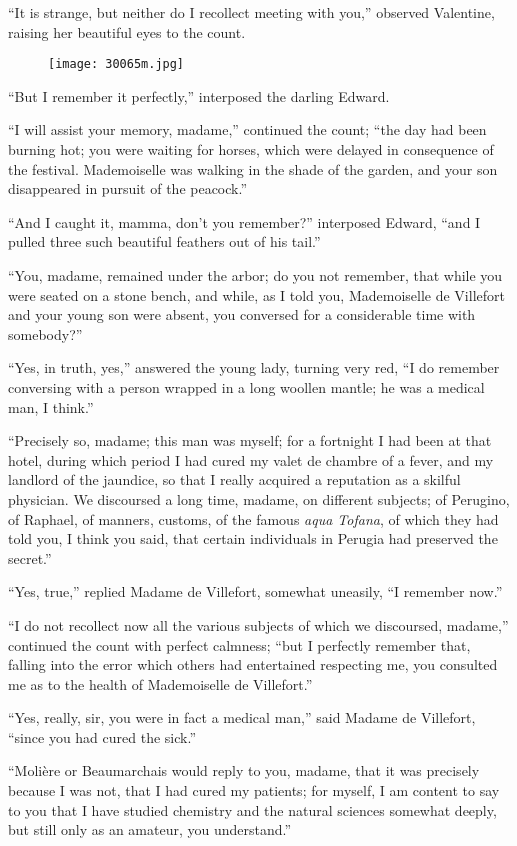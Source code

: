 “It is strange, but neither do I recollect meeting with you,” observed
Valentine, raising her beautiful eyes to the count.

\begin{figure}[ht]
\texttt{[image: 30065m.jpg]}
\end{figure}

“But I remember it perfectly,” interposed the darling Edward.

“I will assist your memory, madame,” continued the count; “the day had
been burning hot; you were waiting for horses, which were delayed in
consequence of the festival. Mademoiselle was walking in the shade of
the garden, and your son disappeared in pursuit of the peacock.”

“And I caught it, mamma, don’t you remember?” interposed Edward, “and I
pulled three such beautiful feathers out of his tail.”

“You, madame, remained under the arbor; do you not remember, that while
you were seated on a stone bench, and while, as I told you,
Mademoiselle de Villefort and your young son were absent, you conversed
for a considerable time with somebody?”

“Yes, in truth, yes,” answered the young lady, turning very red, “I do
remember conversing with a person wrapped in a long woollen mantle; he
was a medical man, I think.”

“Precisely so, madame; this man was myself; for a fortnight I had been
at that hotel, during which period I had cured my valet de chambre of a
fever, and my landlord of the jaundice, so that I really acquired a
reputation as a skilful physician. We discoursed a long time, madame,
on different subjects; of Perugino, of Raphael, of manners, customs, of
the famous \textit{aqua Tofana}, of which they had told you, I think you said,
that certain individuals in Perugia had preserved the secret.”

“Yes, true,” replied Madame de Villefort, somewhat uneasily, “I
remember now.”

“I do not recollect now all the various subjects of which we
discoursed, madame,” continued the count with perfect calmness; “but I
perfectly remember that, falling into the error which others had
entertained respecting me, you consulted me as to the health of
Mademoiselle de Villefort.”

“Yes, really, sir, you were in fact a medical man,” said Madame de
Villefort, “since you had cured the sick.”

“Molière or Beaumarchais would reply to you, madame, that it was
precisely because I was not, that I had cured my patients; for myself,
I am content to say to you that I have studied chemistry and the
natural sciences somewhat deeply, but still only as an amateur, you
understand.”

